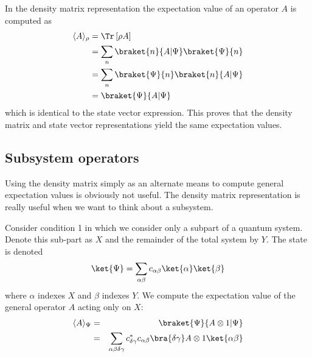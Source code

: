 \documentclass{article}
\begin{document}
In the density matrix representation the expectation value of an operator $A$ is computed as \begin{align}
\langle A \rangle_{\rho} &= \Tr \left[ \rho A \right] \nonumber \\
&= \sum_n \braket{n}{A|\Psi}\braket{\Psi}{n} \nonumber \\
&= \sum_n \braket{\Psi}{n}\braket{n}{A|\Psi} \nonumber \\
&= \braket{\Psi}{A|\Psi}
\end{align}
which is identical to the state vector expression.
This proves that the density matrix and state vector representations yield the same expectation values.

\subsection{Subsystem operators}

Using the density matrix simply as an alternate means to compute general expectation values is obviously not useful. The density matrix representation is really useful when we want to think about a subsystem.

Consider condition 1 in which we consider only a subpart of a quantum system. Denote this sub-part as $X$ and the remainder of the total system by $Y$. The state is denoted \begin{equation}
\ket{\Psi} = \sum_{\alpha \beta} c_{\alpha \beta} \ket{\alpha}\ket{\beta} \end{equation}
where $\alpha$ indexes $X$ and $\beta$ indexes $Y$. We compute the expectation value of the general operator $A$ acting only on $X$:
\begin{eqnarray}
\langle A \rangle_{\Psi} &=& \braket{\Psi}{A \otimes 1|\Psi} \nonumber \\
&=& \sum_{\alpha \beta \delta \gamma} c^*_{\delta \gamma}c_{\alpha \beta} \bra{\delta \gamma} A \otimes 1 \ket{\alpha \beta} \end{eqnarray}
\end{document}
